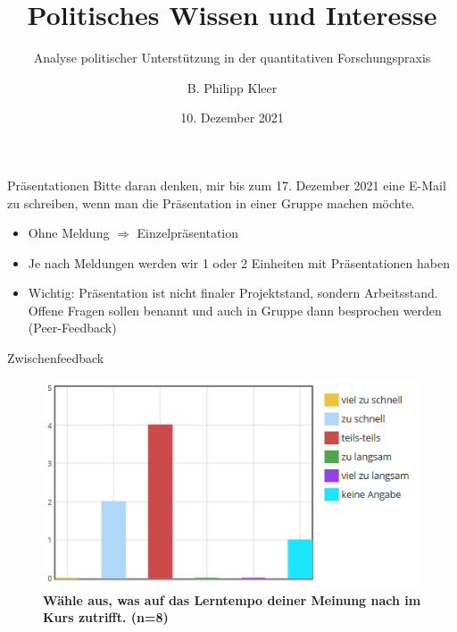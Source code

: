 \documentclass[11pt]{beamer}
\title{Politisches Wissen und Interesse}
\subtitle{Analyse politischer Unterstützung in der quantitativen Forschungspraxis}
\date{10. Dezember 2021}
\author{B. Philipp Kleer}
\institute{Institut für Politikwissenschaft | Justus-Liebig-Universität Gießen}
\begin{document}
\begin{frame}
	\maketitle
\end{frame}

\begin{frame}[t]{Präsentationen}
Bitte daran denken, mir bis zum 17. Dezember 2021 eine E-Mail zu schreiben, wenn man die Präsentation in einer Gruppe machen möchte. 

  \begin{itemize}
    \item Ohne Meldung $\Rightarrow$ Einzelpräsentation
    \item Je nach Meldungen werden wir 1 oder 2 Einheiten mit Präsentationen haben
    \item Wichtig: Präsentation ist nicht finaler Projektstand, sondern Arbeitsstand. Offene Fragen sollen benannt und auch in Gruppe dann besprochen werden (Peer-Feedback)
  \end{itemize}
\end{frame}


\begin{frame}{Zwischenfeedback}
\begin{figure}[ht]
	\includegraphics[width=\textwidth]{./pics/lerntempo.png}
	\caption{\textbf{Wähle aus, was auf das Lerntempo deiner Meinung nach im Kurs zutrifft. (n=8)}}
\end{figure}
\end{frame}
\end{document}
